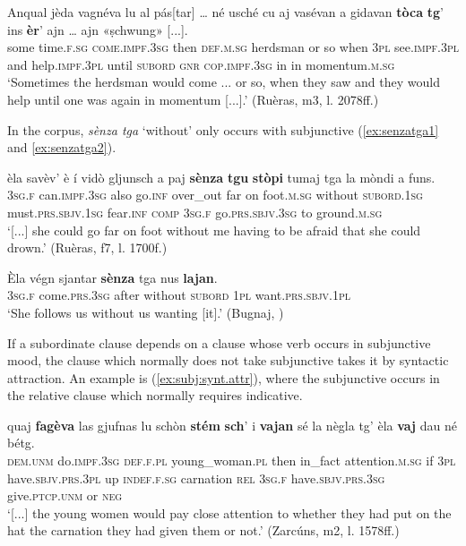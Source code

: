 \ea
\label{ex:toca:ind}
\gll  Anqual jèda vagnéva lu al pás[tar] … né usché cu aj vasévan a gidavan \textbf{tòca} \textbf{tg}’ ins \textbf{èr}’ ajn … ajn «ṣchwung» [...].\\
some time.\textsc{f.sg} \textsc{come.impf.3sg} then \textsc{def.m.sg} herdsman {} or so when \textsc{3pl} see.\textsc{impf.3pl} and help.\textsc{impf.3pl} until \textsc{subord} \textsc{gnr} \textsc{cop.impf.3sg} in {} in momentum.\textsc{m.sg}\\
\glt `Sometimes the herdsman would come ... or so, when they saw and they would help until one was again in momentum [...].' (Ruèras, m3, l. 2078ff.)
\z

In the corpus, \textit{sènza tga} `without' only occurs with subjunctive (\ref{ex:senzatga1} and \ref{ex:senzatga2}).

\ea
\label{ex:senzatga1}
\gll  [...] èla savèv’ è í vidò gljunsch a paj \textbf{sènza} \textbf{tgu} \textbf{stòpi} tumaj tga la mòndi a funs. \\
{} \textsc{3sg.f} can.\textsc{impf.3sg} also go.\textsc{inf} over\_out far on foot.\textsc{m.sg} without \textsc{subord.1sg} must.\textsc{prs.sbjv.1sg} fear.\textsc{inf} \textsc{comp} \textsc{3sg.f} go.\textsc{prs.sbjv.3sg} to ground.\textsc{m.sg}\\
\glt `[...] she could go far on foot without me having to be afraid that she could drown.' (Ruèras, f7, l. 1700f.)
\z

\ea
\label{ex:senzatga2}
\gll Èla végn sjantar \textbf{sènza} tga nus \textbf{lajan}.\\
\textsc{3sg.f} come.\textsc{prs.3sg} after without \textsc{subord} \textsc{1pl} want.\textsc{prs.sbjv.1pl}\\
\glt `She follows us without us wanting [it].' (Bugnaj, \citealt[132]{Büchli1966})
\z

If a subordinate clause depends on a clause whose verb occurs in subjunctive mood, the clause which normally does not take subjunctive takes it by syntactic attraction. An example is (\ref{ex:subj:synt.attr}), where the subjunctive occurs in the relative clause which normally requires indicative.

\ea
\label{ex:subj:synt.attr}
	\gll    [...] quaj \textbf{fagèva} las gjufnas lu schòn \textbf{stém} \textbf{sch}’ i \textbf{vajan} sé la nègla tg’ èla \textbf{vaj} dau né bétg.\\
{} \textsc{dem.unm} do.\textsc{impf.3sg} \textsc{def.f.pl} young\_woman.\textsc{pl} then in\_fact attention.\textsc{m.sg} if \textsc{3pl}  have.\textsc{sbjv.prs.3pl} up \textsc{indef.f.sg} carnation \textsc{rel} \textsc{3sg.f} have.\textsc{sbjv.prs.3sg}  give.\textsc{ptcp.unm} or \textsc{neg} \\
\glt `[...] the young women would pay close attention to whether they had put on the hat the carnation they had given them or not.' (Zarcúns, m2, l. 1578ff.)
\z

